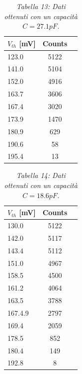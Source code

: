 \documentclass[a4paper]{article}
\begin{document}
\begin{table}[H]
	
		\begin{tabular}{lcc}
			\hline
			\hline
			\textbf{$V_{th}$} [mV] & \textbf{Counts}  	\\
			\hline
			\hline
				      123.0 &  5122	 \\
				      141.0 &  5104	 \\
				      152.0 &  4916	 \\
				      163.7 &  3606	  \\
				      167.4 &  3020	 \\
				      173.9 &  1470	 \\
				      180.9 &  629	  \\
				      190.6 & 58  \\
				      195.4 &  13  \\
				      
			\hline
			\hline
		\end{tabular}
		\linebreak
		\caption{\textit{Tabella 13: Dati ottenuti con un capacità $C=27.1 pF$.}}\label{tab:13} 
	\end{table}	
	
	\begin{table}[H]
	
		\begin{tabular}{lcc}
			\hline
			\hline
			\textbf{$V_{th}$} [mV] & \textbf{Counts}  	\\
			\hline
			\hline
				      130.0 &  5122	 \\
				      142.0 &  5117 \\
				      143.4 &  5112	 \\
				      151.0 &  4967	  \\
				      158.5 &  4500	 \\
				      161.2 &  4064	 \\
					  163.5 & 3788		\\		      
				      167.4.9 &  2797	  \\
				      169.4 & 2059  \\
				      178.5 & 852  \\
				      180.4 & 149 \\
					  192.8 & 8 \\			
			\hline
			\hline
		\end{tabular}
		\linebreak
		\caption{\textit{Tabella 14: Dati ottenuti con un capacità $C=18.6 pF$.}}\label{tab:14} 
	\end{table}	
	
\end{document}
